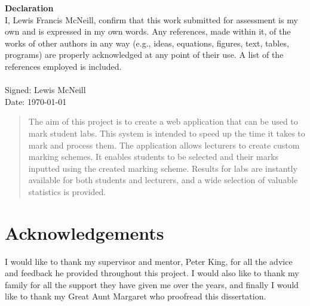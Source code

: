 \documentclass[11pt]{report}
\begin{document}





\newpage
\setcounter{page}{1}
\doublespacing
\textbf{\Large{Declaration}} \\[2em]
I, Lewis Francis McNeill, confirm that this work submitted for assessment is my own and is expressed in my own words. Any references, made within it, of the works of other authors in any way (e.g., ideas, equations, figures, text, tables, programs) are properly acknowledged at any point of their use. A list of the references employed is included.
\\
\\
Signed: Lewis McNeill
\\
Date: \today


\newpage               
\begin{abstract}\thispagestyle{plain} \setcounter{page}{2}
\noindent

The aim of this project is to create a web application that can be used to mark student labs. This system is intended to speed up the time it takes to mark and process them. The application allows lecturers to create custom marking schemes. It enables students to be selected and their marks inputted using the created marking scheme. Results for labs are instantly available for both students and lecturers, and a wide selection of valuable statistics is provided.

\end{abstract}
\newpage 



\section*{Acknowledgements} \setcounter{page}{3}
 I would like to thank my supervisor and mentor, Peter King, for all the advice and feedback he provided throughout this project. I would also like to thank my family for all the support they have given me over the years, and finally I would like to thank my Great Aunt Margaret who proofread this dissertation.
\end{document}
